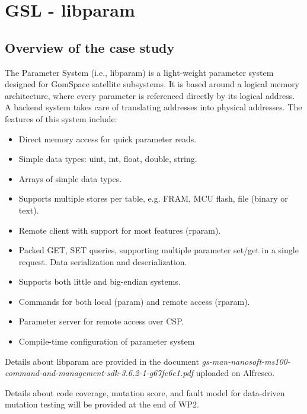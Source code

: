 \section{GSL - libparam}
\label{sec:caseStudies:GSL:libparam}

\subsection{Overview of the case study}

The Parameter System (i.e., libparam) is a light-weight parameter system designed for GomSpace satellite subsystems. It is based around a logical memory architecture, where every parameter is referenced directly by its logical address. A backend system takes care of translating addresses into physical addresses.
The features of this system include:
\begin{itemize}
\item Direct memory access for quick parameter reads.
\item Simple data types: uint, int, float, double, string.
\item Arrays of simple data types.
\item Supports multiple stores per table, e.g. FRAM, MCU flash, file (binary or text).
\item Remote client with support for most features (rparam).
\item Packed GET, SET queries, supporting multiple parameter set/get in a single request. Data serialization and deserialization.
\item Supports both little and big-endian systems.
\item Commands for both local (param) and remote access (rparam).
\item Parameter server for remote access over CSP.
\item Compile-time configuration of parameter system
\end{itemize}

Details about libparam are provided in the document \emph{gs-man-nanosoft-ms100-command-and-management-sdk-3.6.2-1-g67fe6e1.pdf} uploaded on Alfresco.

Details about code coverage, mutation  score, and fault model for data-driven mutation testing will be provided at the end of WP2.

